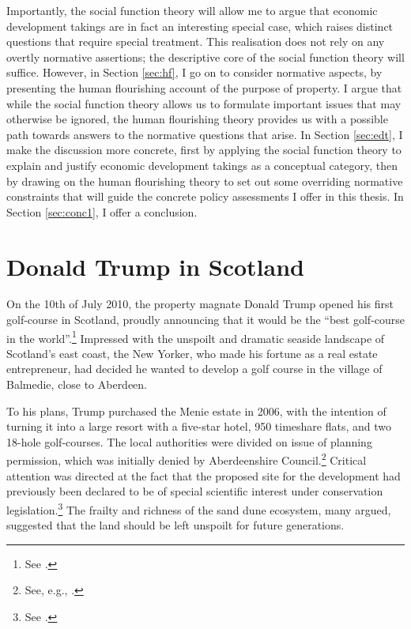 Importantly, the social function theory will allow me to argue that economic development takings are in fact an interesting special case, which raises distinct questions that require special treatment. This realisation does not rely on any overtly normative assertions; the descriptive core of the social function theory will suffice. However, in Section \ref{sec:hf}, I go on to consider normative aspects, by presenting the human flourishing account of the purpose of property. I argue that while the social function theory allows us to formulate important issues that may otherwise be ignored, the human flourishing theory provides us with a possible path towards answers to the normative questions that arise. In Section \ref{sec:edt}, I make the discussion more concrete, first by applying the social function theory to explain and justify economic development takings as a conceptual category, then by drawing on the human flourishing theory to set out some overriding normative constraints that will guide the concrete policy assessments I offer in this thesis. In Section \ref{sec:conc1}, I offer a conclusion.

\section{Donald Trump in Scotland}\label{sec:dts}

On the 10th of July 2010, the property magnate Donald Trump opened his first golf-course in Scotland, proudly announcing that it would be the ``best golf-course in the world''.\footnote{See \cite{passow12}.} Impressed with the unspoilt and dramatic seaside landscape of Scotland's east coast, the New Yorker, who made his fortune as a real estate entrepreneur, had decided he wanted to develop a golf course in the village of Balmedie, close to Aberdeen.

To  his plans, Trump purchased the Menie estate in 2006, with the intention of turning it into a large resort with a five-star hotel, 950 timeshare flats, and two 18-hole golf-courses. The local authorities were divided on issue of planning permission, which was initially denied by Aberdeenshire Council.\footnote{See, e.g., \cite{bbc07}.} Critical attention was directed at the fact that the proposed site for the development had previously been declared to be of special scientific interest under conservation legislation.\footnote{See \cite{bbc07b}.} The frailty and richness of the sand dune ecosystem, many argued, suggested that the land should be left unspoilt for future generations. 

